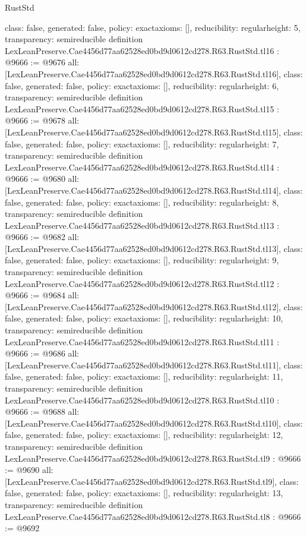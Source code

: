 \begin{lexlean}{RustStd}
\begin{coremodule}
{  class: false,
  generated: false,
  policy: exact{axioms: []},
  reducibility: regular{height: 5},
  transparency: semireducible
}
definition LexLeanPreserve.Cae4456d77aa62528ed0bd9d0612cd278.R63.RustStd.tl16 : @9666 := @9676 {
  all: [LexLeanPreserve.Cae4456d77aa62528ed0bd9d0612cd278.R63.RustStd.tl16],
  class: false,
  generated: false,
  policy: exact{axioms: []},
  reducibility: regular{height: 6},
  transparency: semireducible
}
definition LexLeanPreserve.Cae4456d77aa62528ed0bd9d0612cd278.R63.RustStd.tl15 : @9666 := @9678 {
  all: [LexLeanPreserve.Cae4456d77aa62528ed0bd9d0612cd278.R63.RustStd.tl15],
  class: false,
  generated: false,
  policy: exact{axioms: []},
  reducibility: regular{height: 7},
  transparency: semireducible
}
definition LexLeanPreserve.Cae4456d77aa62528ed0bd9d0612cd278.R63.RustStd.tl14 : @9666 := @9680 {
  all: [LexLeanPreserve.Cae4456d77aa62528ed0bd9d0612cd278.R63.RustStd.tl14],
  class: false,
  generated: false,
  policy: exact{axioms: []},
  reducibility: regular{height: 8},
  transparency: semireducible
}
definition LexLeanPreserve.Cae4456d77aa62528ed0bd9d0612cd278.R63.RustStd.tl13 : @9666 := @9682 {
  all: [LexLeanPreserve.Cae4456d77aa62528ed0bd9d0612cd278.R63.RustStd.tl13],
  class: false,
  generated: false,
  policy: exact{axioms: []},
  reducibility: regular{height: 9},
  transparency: semireducible
}
definition LexLeanPreserve.Cae4456d77aa62528ed0bd9d0612cd278.R63.RustStd.tl12 : @9666 := @9684 {
  all: [LexLeanPreserve.Cae4456d77aa62528ed0bd9d0612cd278.R63.RustStd.tl12],
  class: false,
  generated: false,
  policy: exact{axioms: []},
  reducibility: regular{height: 10},
  transparency: semireducible
}
definition LexLeanPreserve.Cae4456d77aa62528ed0bd9d0612cd278.R63.RustStd.tl11 : @9666 := @9686 {
  all: [LexLeanPreserve.Cae4456d77aa62528ed0bd9d0612cd278.R63.RustStd.tl11],
  class: false,
  generated: false,
  policy: exact{axioms: []},
  reducibility: regular{height: 11},
  transparency: semireducible
}
definition LexLeanPreserve.Cae4456d77aa62528ed0bd9d0612cd278.R63.RustStd.tl10 : @9666 := @9688 {
  all: [LexLeanPreserve.Cae4456d77aa62528ed0bd9d0612cd278.R63.RustStd.tl10],
  class: false,
  generated: false,
  policy: exact{axioms: []},
  reducibility: regular{height: 12},
  transparency: semireducible
}
definition LexLeanPreserve.Cae4456d77aa62528ed0bd9d0612cd278.R63.RustStd.tl9 : @9666 := @9690 {
  all: [LexLeanPreserve.Cae4456d77aa62528ed0bd9d0612cd278.R63.RustStd.tl9],
  class: false,
  generated: false,
  policy: exact{axioms: []},
  reducibility: regular{height: 13},
  transparency: semireducible
}
definition LexLeanPreserve.Cae4456d77aa62528ed0bd9d0612cd278.R63.RustStd.tl8 : @9666 := @9692 {
}
\end{coremodule}
\end{lexlean}
